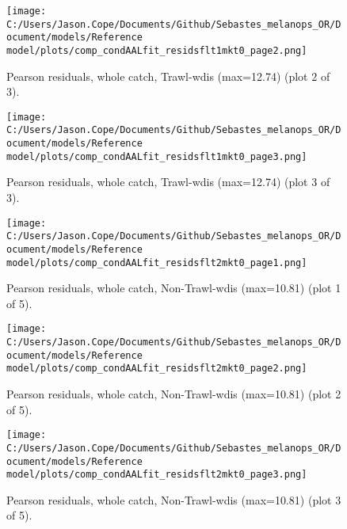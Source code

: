\documentclass[11pt,
  letterpaper,
]{article}
\begin{document}
\begin{figure}
{\centering
\texttt{[image: C:/Users/Jason.Cope/Documents/Github/Sebastes\_melanops\_OR/Document/models/Reference model/plots/comp\_condAALfit\_residsflt1mkt0\_page2.png]}
}
\caption{Pearson residuals, whole catch, Trawl-wdis (max=12.74) (plot 2 of 3).\label{fig:comp_condAALfit_residsflt1mkt0_page2}}
\end{figure}

\begin{figure}
{\centering
\texttt{[image: C:/Users/Jason.Cope/Documents/Github/Sebastes\_melanops\_OR/Document/models/Reference model/plots/comp\_condAALfit\_residsflt1mkt0\_page3.png]}
}
\caption{Pearson residuals, whole catch, Trawl-wdis (max=12.74) (plot 3 of 3).\label{fig:comp_condAALfit_residsflt1mkt0_page3}}
\end{figure}

\begin{figure}
{\centering
\texttt{[image: C:/Users/Jason.Cope/Documents/Github/Sebastes\_melanops\_OR/Document/models/Reference model/plots/comp\_condAALfit\_residsflt2mkt0\_page1.png]}
}
\caption{Pearson residuals, whole catch, Non-Trawl-wdis (max=10.81) (plot 1 of 5).\label{fig:comp_condAALfit_residsflt2mkt0_page1}}
\end{figure}

\begin{figure}
{\centering
\texttt{[image: C:/Users/Jason.Cope/Documents/Github/Sebastes\_melanops\_OR/Document/models/Reference model/plots/comp\_condAALfit\_residsflt2mkt0\_page2.png]}
}
\caption{Pearson residuals, whole catch, Non-Trawl-wdis (max=10.81) (plot 2 of 5).\label{fig:comp_condAALfit_residsflt2mkt0_page2}}
\end{figure}

\begin{figure}
{\centering
\texttt{[image: C:/Users/Jason.Cope/Documents/Github/Sebastes\_melanops\_OR/Document/models/Reference model/plots/comp\_condAALfit\_residsflt2mkt0\_page3.png]}
}
\caption{Pearson residuals, whole catch, Non-Trawl-wdis (max=10.81) (plot 3 of 5).\label{fig:comp_condAALfit_residsflt2mkt0_page3}}
\end{figure}
\end{document}
